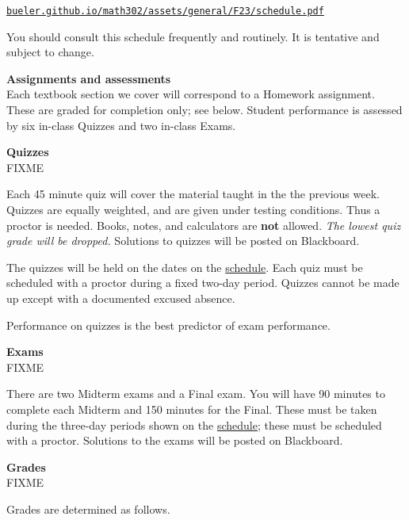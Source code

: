 \documentclass[12pt]{article}
\renewcommand{\emph}[1]{\textsf{\textbf{#1}}}
\newcommand{\localhead}[1]{\par\smallskip\textbf{#1}\nobreak\\}%
\def\heading#1{\localhead{\large\emph{#1}}}
\def\subheading#1{\localhead{\emph{#1}}}
\begin{document}
\smallskip
\centerline{\href{https://bueler.github.io/math302/assets/general/F23/schedule.pdf}{\tt bueler.github.io/math302/assets/general/F23/schedule.pdf}}

You should consult this schedule frequently and routinely.  It is tentative and subject to change.


\heading{Assignments and assessments}
Each textbook section we cover will correspond to a Homework assignment.  These are graded for completion only; see below.  Student performance is assessed by six in-class Quizzes and two in-class Exams.


\subheading{Quizzes}
FIXME

Each 45 minute quiz will cover the material taught in the the previous week.  Quizzes are equally weighted, and are given under testing conditions.  Thus a proctor is needed.  Books, notes, and calculators are \emph{not} allowed.  \textsl{The lowest quiz grade will be dropped.}  Solutions to quizzes will be posted on Blackboard.

The quizzes will be held on the dates on the \href{https://bueler.github.io/math302/assets/general/F23/schedule.pdf}{schedule}.  Each quiz must be scheduled with a proctor during a fixed two-day period.  Quizzes cannot be made up except with a documented excused absence.

Performance on quizzes is the best predictor of exam performance.

\subheading{Exams}
FIXME

There are two Midterm exams and a Final exam.  You will have 90 minutes to complete each Midterm and 150 minutes for the Final.  These must be taken during the three-day periods shown on the \href{https://bueler.github.io/math302/assets/general/F23/schedule.pdf}{schedule}; these must be scheduled with a proctor.  Solutions to the exams will be posted on Blackboard.


\heading{Grades}
FIXME

Grades are determined as follows.
 
\end{document}
